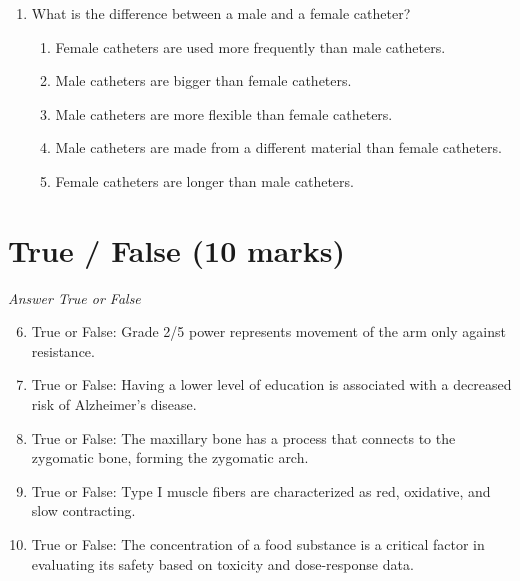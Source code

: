 \documentclass[12pt]{article}
\begin{document}
\begin{enumerate}[label=\arabic*.]
\begin{enumerate}[label=(\alph*)]
    \item Weight-for-age Z score \textless{}-2 and oedema
    \item Height-for-age Z score \textless{}-2 or weight-for-height Z score \textless{}-2 and oedema
    \item Height-for-age Z score \textless{}-3 and oedema
    \item Weight-for-age Z score \textless{}-2 or height-for-age Z score \textless{}-2 or oedema
    \item Height-for-age Z score \textless{}-3 or weight-for-age Z score \textless{}-3 and oedema
\end{enumerate}
\item What is the difference between a male and a female catheter?
\begin{enumerate}[label=(\alph*)]
    \item Female catheters are used more frequently than male catheters.
    \item Male catheters are bigger than female catheters.
    \item Male catheters are more flexible than female catheters.
    \item Male catheters are made from a different material than female catheters.
    \item Female catheters are longer than male catheters.
\end{enumerate}
\end{enumerate}

\section*{True / False (10 marks)}
\textit{Answer True or False}
\begin{enumerate}[label=\arabic*.]
\setcounter{enumi}{5}
\item True or False: Grade 2/5 power represents movement of the arm only against resistance.
\item True or False: Having a lower level of education is associated with a decreased risk of Alzheimer's disease.
\item True or False: The maxillary bone has a process that connects to the zygomatic bone, forming the zygomatic arch.
\item True or False: Type I muscle fibers are characterized as red, oxidative, and slow contracting.
\item True or False: The concentration of a food substance is a critical factor in evaluating its safety based on toxicity and dose-response data.
\end{enumerate}
\end{document}
